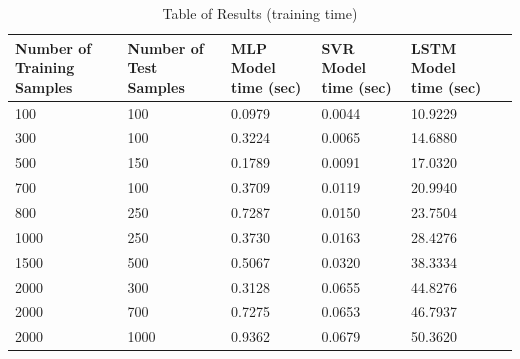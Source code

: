 \documentclass{article}
\begin{document}
\begin{table}[htb!]
	\centering
	\begin{tabular}{p{2cm} p{2cm} p{2cm} p{2cm} p{2cm} p{2cm}}
		\toprule
		Number of Training Samples & Number of Test Samples & MLP Model time (sec) & SVR Model time (sec) & LSTM Model time (sec) \\
		\midrule
		100 & 100 & 0.0979 & 0.0044 & 10.9229 \\
		\midrule
		300 & 100 & 0.3224 & 0.0065 & 14.6880 \\
		\midrule
		500 & 150 & 0.1789 & 0.0091 & 17.0320 \\
		\midrule
		700 & 100 & 0.3709 & 0.0119 & 20.9940 \\
		\midrule
		800 & 250 & 0.7287 & 0.0150 & 23.7504 \\
		\midrule
		1000 & 250 & 0.3730 & 0.0163 & 28.4276 \\
		\midrule
		1500 & 500 & 0.5067 & 0.0320 & 38.3334 \\
		\midrule
		2000 & 300 & 0.3128 & 0.0655 & 44.8276 \\
		\midrule
		2000 & 700 & 0.7275 & 0.0653 & 46.7937 \\
		\midrule
		2000 & 1000 & 0.9362 & 0.0679 & 50.3620 \\
		\bottomrule
	\end{tabular}
	\caption{Table of Results (training time)}
\end{table}
\end{document}
